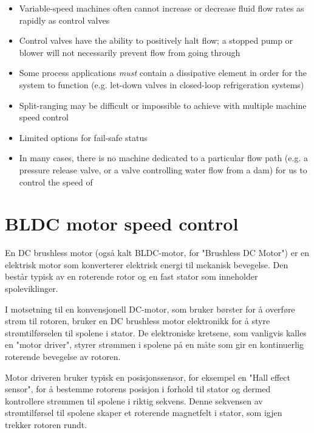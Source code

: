 \begin{itemize}
\item Variable-speed machines often cannot increase or decrease fluid flow rates as rapidly as control valves
\item Control valves have the ability to positively halt flow; a stopped pump or blower will not necessarily prevent flow from going through
\item Some process applications \textit{must} contain a dissipative element in order for the system to function (e.g. let-down valves in closed-loop refrigeration systems)
\item Split-ranging may be difficult or impossible to achieve with multiple machine speed control
\item Limited options for fail-safe status
\item In many cases, there is no machine dedicated to a particular flow path (e.g. a pressure release valve, or a valve controlling water flow from a dam) for us to control the speed of
\end{itemize}













\filbreak
\filbreak
\section{BLDC motor speed control}
En DC brushless motor (også kalt BLDC-motor, for "Brushless DC Motor") er en elektrisk motor som konverterer elektrisk energi til mekanisk bevegelse. Den består typisk av en roterende rotor og en fast stator som inneholder spoleviklinger.

I motsetning til en konvensjonell DC-motor, som bruker børster for å overføre strøm til rotoren, bruker en DC brushless motor elektronikk for å styre strømtilførselen til spolene i stator. De elektroniske kretsene, som vanligvis kalles en "motor driver", styrer strømmen i spolene på en måte som gir en kontinuerlig roterende bevegelse av rotoren.

Motor driveren bruker typisk en posisjonssensor, for eksempel en "Hall effect sensor", for å bestemme rotorens posisjon i forhold til stator og dermed kontrollere strømmen til spolene i riktig sekvens. Denne sekvensen av strømtilførsel til spolene skaper et roterende magnetfelt i stator, som igjen trekker rotoren rundt.

